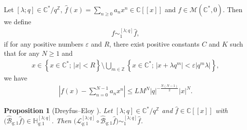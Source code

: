 \documentclass[pdftex]{sigma}
\numberwithin{equation}{section}
\newtheorem{Proposition}[Theorem]{Proposition}
\begin{document}
Let $[\lambda;q]\in\mathbb{C}^*/q^\mathbb{Z}$, $\hat{f}(x)=\sum\limits_{n\ge0}a_nx^n\in\mathbb{C}[[x]]$ and $f\in\mathcal{M}(\mathbb{C}^*,0)$. Then we define
\begin{gather*}
f\sim_1^{[\lambda;q]}\hat{f},
\end{gather*}
if for any positive numbers $\varepsilon$ and $R$, there exist positive constants $C$ and $K$ such that for any $N\ge1$ and
\begin{gather*}
x\in\left\{x\in\mathbb{C}^* ;\,|x|<R\right\}\setminus\bigcup_{m\in\mathbb{Z}}\left\{x\in\mathbb{C}^* ;\,|x+\lambda q^m|<\varepsilon |q^m\lambda |\right\},
\end{gather*}
we have
\begin{gather*}
\left|f(x)-\sum_{n=0}^{N-1}a_nx^n\right|\le LM^N|q|^{-\frac{N(N-1)}{2}}|x|^N.
\end{gather*}
\begin{Proposition}[Dreyfus--Eloy {\cite[Section~1]{DreyfusEloy2016}}]\label{qBorel_AE}
Let $[\lambda;q]\in\mathbb{C}^*/q^\mathbb{Z}$ and $\hat{f}\in\mathbb{C}[[x]]$ with $\big(\hat{\mathcal{B}}_{q;1}\hat{f}\big)\in\mathbb{H}_{q;1}^{[\lambda;q]}$. Then $\big(\mathcal{L}_{q;1}^{[\lambda;q]}\circ\hat{\mathcal{B}}_{q;1}\hat{f}\big)\sim_{1}^{[\lambda;q]}\hat{f}$.
\end{Proposition}
\end{document}
